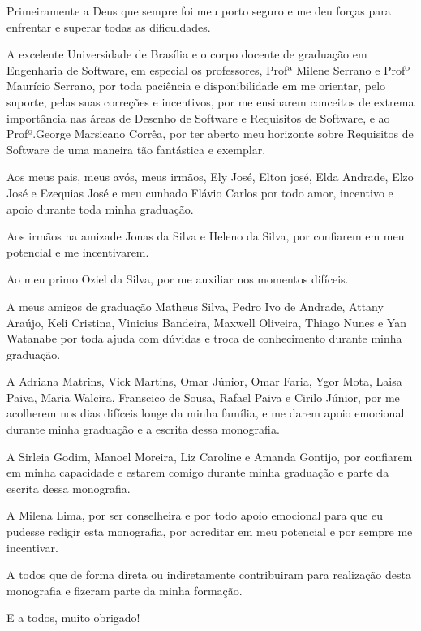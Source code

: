 \begin{agradecimentos}

	Primeiramente a Deus que sempre foi meu porto seguro e me deu forças para enfrentar e superar todas as dificuldades.
	 
	A excelente Universidade de Brasília e o corpo docente de graduação em Engenharia de Software, em especial os professores, Profª Milene Serrano e Profº Maurício Serrano, por toda paciência e disponibilidade em me orientar, pelo suporte, pelas suas correções e incentivos, por me ensinarem conceitos de extrema importância nas áreas de Desenho de Software e Requisitos de Software, e ao Profº.George Marsicano Corrêa, por ter aberto meu horizonte sobre Requisitos de Software de uma maneira tão fantástica e exemplar.
	
	Aos meus pais, meus avós, meus irmãos, Ely José, Elton josé, Elda Andrade, Elzo José e Ezequias José e meu cunhado Flávio Carlos por todo amor, incentivo e apoio durante toda minha graduação. 
	
	Aos irmãos na amizade Jonas da Silva e Heleno da Silva, por confiarem em meu potencial e me incentivarem. 
	
	Ao meu primo Oziel da Silva, por me auxiliar nos momentos difíceis. 
	
	A meus amigos de graduação Matheus Silva, Pedro Ivo de Andrade, Attany Araújo, Keli Cristina, Vinicius Bandeira, Maxwell Oliveira, Thiago Nunes e Yan Watanabe por toda ajuda com dúvidas e troca de conhecimento durante minha graduação. 
	
	A Adriana Matrins, Vick Martins, Omar Júnior, Omar Faria, Ygor Mota, Laisa Paiva, Maria Walcira, Franscico de Sousa, Rafael Paiva e Cirilo Júnior, por me acolherem nos dias difíceis longe da minha família,  e me darem apoio emocional durante minha graduação e a escrita dessa monografia. 
	
	A Sirleia Godim, Manoel Moreira, Liz Caroline e Amanda Gontijo, por confiarem em minha capacidade e estarem comigo durante minha graduação e parte da escrita dessa monografia. 
	
	A Milena Lima, por ser conselheira e por todo apoio emocional para que eu pudesse redigir esta monografia, por acreditar em meu potencial e por sempre me incentivar.
	
	A todos que de forma direta ou indiretamente contribuiram para realização desta monografia e fizeram parte da minha formação. 
	
	E a todos, muito obrigado!  
	
\end{agradecimentos}
